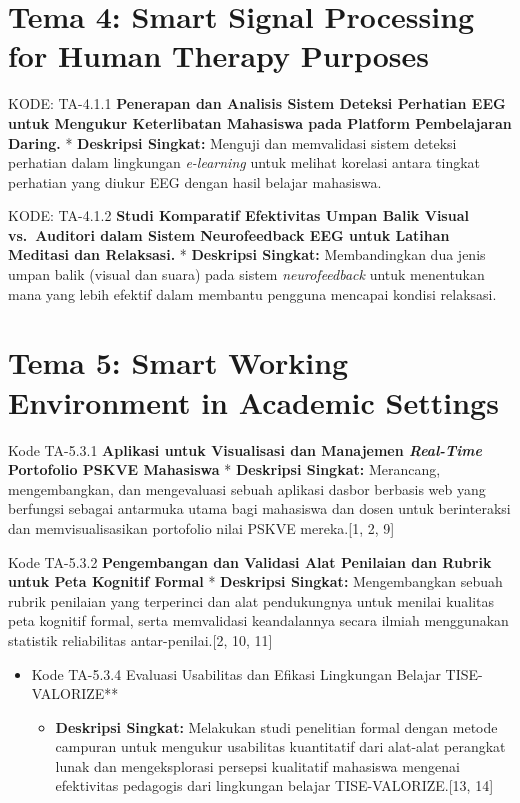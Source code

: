 \documentclass[
  letterpaper,
  DIV=11,
  numbers=noendperiod]{scrreprt}
\providecommand{\tightlist}{%
  \setlength{\itemsep}{0pt}\setlength{\parskip}{0pt}}
\begin{document}
\section{Tema 4: Smart Signal Processing for Human Therapy
Purposes}\label{tema-4-smart-signal-processing-for-human-therapy-purposes-2}

KODE: TA-4.1.1 \textbf{Penerapan dan Analisis Sistem Deteksi Perhatian
EEG untuk Mengukur Keterlibatan Mahasiswa pada Platform Pembelajaran
Daring.} * \textbf{Deskripsi Singkat:} Menguji dan memvalidasi sistem
deteksi perhatian dalam lingkungan \emph{e-learning} untuk melihat
korelasi antara tingkat perhatian yang diukur EEG dengan hasil belajar
mahasiswa.

KODE: TA-4.1.2 \textbf{Studi Komparatif Efektivitas Umpan Balik Visual
vs.~Auditori dalam Sistem Neurofeedback EEG untuk Latihan Meditasi dan
Relaksasi.} * \textbf{Deskripsi Singkat:} Membandingkan dua jenis umpan
balik (visual dan suara) pada sistem \emph{neurofeedback} untuk
menentukan mana yang lebih efektif dalam membantu pengguna mencapai
kondisi relaksasi.

\section{Tema 5: Smart Working Environment in Academic
Settings}\label{tema-5-smart-working-environment-in-academic-settings-2}

Kode TA-5.3.1 \textbf{Aplikasi untuk Visualisasi dan Manajemen
\emph{Real-Time} Portofolio PSKVE Mahasiswa} * \textbf{Deskripsi
Singkat:} Merancang, mengembangkan, dan mengevaluasi sebuah aplikasi
dasbor berbasis web yang berfungsi sebagai antarmuka utama bagi
mahasiswa dan dosen untuk berinteraksi dan memvisualisasikan portofolio
nilai PSKVE mereka.{[}1, 2, 9{]}

Kode TA-5.3.2 \textbf{Pengembangan dan Validasi Alat Penilaian dan
Rubrik untuk Peta Kognitif Formal} * \textbf{Deskripsi Singkat:}
Mengembangkan sebuah rubrik penilaian yang terperinci dan alat
pendukungnya untuk menilai kualitas peta kognitif formal, serta
memvalidasi keandalannya secara ilmiah menggunakan statistik
reliabilitas antar-penilai.{[}2, 10, 11{]}

\begin{itemize}
\tightlist
\item
  Kode TA-5.3.4 Evaluasi Usabilitas dan Efikasi Lingkungan Belajar
  TISE-VALORIZE**

  \begin{itemize}
  \tightlist
  \item
    \textbf{Deskripsi Singkat:} Melakukan studi penelitian formal dengan
    metode campuran untuk mengukur usabilitas kuantitatif dari alat-alat
    perangkat lunak dan mengeksplorasi persepsi kualitatif mahasiswa
    mengenai efektivitas pedagogis dari lingkungan belajar
    TISE-VALORIZE.{[}13, 14{]}
  \end{itemize}
\end{itemize}
\end{document}
